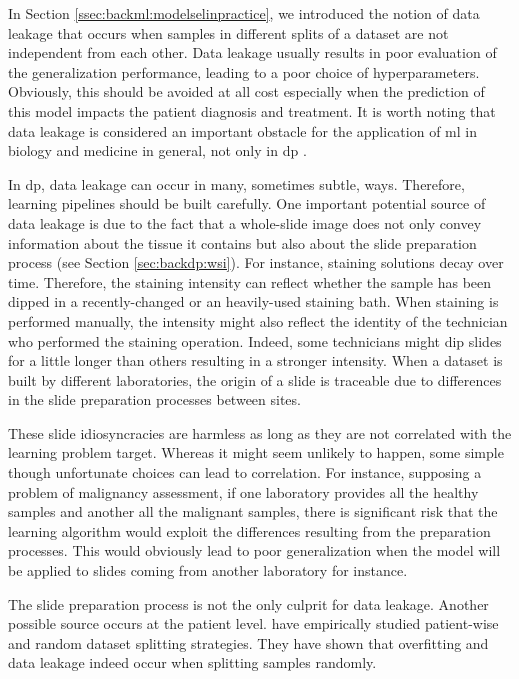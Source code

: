 In Section \ref{ssec:backml:modelselinpractice}, we introduced the notion of data leakage that occurs when samples in different splits of a dataset are not independent from each other. Data leakage usually results in poor evaluation of the generalization performance, leading to a poor choice of hyperparameters. Obviously, this should be avoided at all cost especially when the prediction of this model impacts the patient diagnosis and treatment. It is worth noting that data leakage is considered an important obstacle for the application of \acrlong{ml} in biology and medicine in general, not only in \acrlong{dp} \cite{ching2018opportunities}. 

In \acrlong{dp}, data leakage can occur in many, sometimes subtle, ways. Therefore, learning pipelines should be built carefully. One important potential source of data leakage is due to the fact that a whole-slide image does not only convey information about the tissue it contains but also about the slide preparation process (see Section \ref{sec:backdp:wsi}). For instance, staining solutions decay over time. Therefore, the staining intensity can reflect whether the sample has been dipped in a recently-changed or an heavily-used staining bath. When staining is performed manually, the intensity might also reflect the identity of the technician who performed the staining operation. Indeed, some technicians might dip slides for a little longer than others resulting in a stronger intensity. When a dataset is built by different laboratories, the origin of a slide is traceable due to differences in the slide preparation processes between sites. 

These slide idiosyncracies are harmless as long as they are not correlated with the learning problem target. Whereas it might seem unlikely to happen, some simple though unfortunate choices can lead to correlation. For instance, supposing a problem of malignancy assessment, if one laboratory provides all the healthy samples and another all the malignant samples, there is significant risk that the learning algorithm would exploit the differences resulting from the preparation processes. This would obviously lead to poor generalization when the model will be applied to slides coming from another laboratory for instance. 

The slide preparation process is not the only culprit for data leakage. Another possible source occurs at the patient level. \citeauthor{bussola2021ai} \cite{bussola2021ai} have empirically studied patient-wise and random dataset splitting strategies. They have shown that overfitting and data leakage indeed occur when splitting samples randomly.

